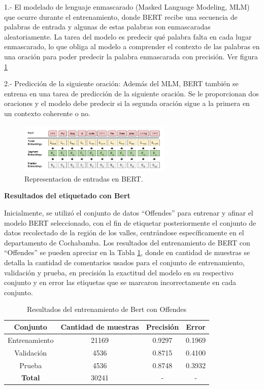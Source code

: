 1.- El modelado de lenguaje enmascarado (Masked Language Modeling, MLM) que ocurre durante el entrenamiento, donde BERT recibe una secuencia de palabras de entrada y algunas de estas palabras son enmascaradas aleatoriamente. La tarea del modelo es predecir qué palabra falta en cada lugar enmascarado, lo que obliga al modelo a comprender el contexto de las palabras en una oración para poder predecir la palabra enmascarada con precisión. Ver figura \ref{fig:nlp8}

2.- Predicción de la siguiente oración: Además del MLM, BERT también se entrena en una tarea de predicción de la siguiente oración. Se le proporcionan dos oraciones y el modelo debe predecir si la segunda oración sigue a la primera en un contexto coherente o no.

\begin{figure}
	\includegraphics[width=0.65\textwidth]{capitulo3/figuras/nlp8.png}
	\caption{Representacion de entradas en BERT.}
	\label{fig:nlp8}
\end{figure}

 \textbf{Resultados del etiquetado con Bert}

Inicialmente, se utilizó el conjunto de datos ``Offendes'' para entrenar y afinar  el modelo BERT seleccionado, con el fin de etiquetar posteriormente el conjunto de datos recolectado de la región de los valles, centrándose específicamente en el departamento de Cochabamba. Los resultados del entrenamiento de BERT con ``Offendes'' se pueden apreciar en la Tabla \ref{tbl:bert}, donde en cantidad de muestras se detalla la cantidad de comentarios usados para el conjunto de entrenamiento, validación y prueba, en precisión la exactitud del modelo en su respectivo conjunto y en error las etiquetas que se marcaron incorrectamente en cada conjunto.

\begin{table}[!ht]
	\centering
	\begin{tabular}{|c|c|c|c|}
		\hline
		\textbf{Conjunto} & \textbf{Cantidad de muestras} & \textbf{Precisión} & \textbf{Error} \\ \hline
		Entrenamiento & 21169 & 0.9297 & 0.1969 \\ 
		Validación & 4536 & 0.8715 & 0.4100 \\ 
		Prueba & 4536 & 0.8748 & 0.3932 \\ \hline
		\textbf{Total} & 30241 & - & - \\ \hline
	\end{tabular}
	\caption{Resultados del entrenamiento de Bert con Offendes}
	\label{tbl:bert}
\end{table}


